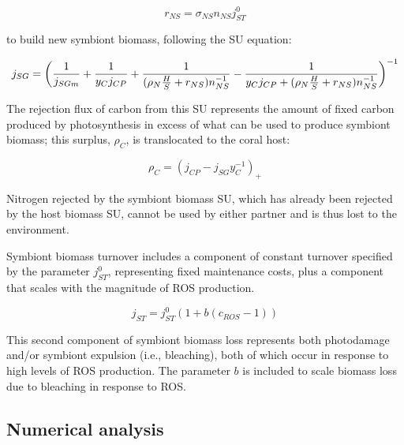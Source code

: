 \documentclass[]{elsarticle} %
\begin{document}
\begin{equation} r_{NS}=\sigma_{NS}n_{NS}j_{ST}^0 \end{equation}

to build new symbiont biomass, following the SU equation:

\begin{equation} j_{SG} = \bigg({1 \over j_{SGm}} + {1 \over y_{C}j_{CP}} + {1 \over {(\rho_N{H \over S} + r_{NS})n_{NS}^{-1}}} - {1 \over {y_{C}j_{CP} + (\rho_N{H \over S} + r_{NS})n_{NS}^{-1}}}\bigg)^{-1} \end{equation}

The rejection flux of carbon from this SU represents the amount of fixed
carbon produced by photosynthesis in excess of what can be used to
produce symbiont biomass; this surplus, \(\rho_C\), is translocated to
the coral host:

\begin{equation} \rho_C = (j_{CP} - j_{SG}y_{C}^{-1})_+ \end{equation}

Nitrogen rejected by the symbiont biomass SU, which has already been
rejected by the host biomass SU, cannot be used by either partner and is
thus lost to the environment.

Symbiont biomass turnover includes a component of constant turnover
specified by the parameter \(j_{ST}^0\), representing fixed maintenance
costs, plus a component that scales with the magnitude of ROS
production.

\begin{equation} j_{ST} = j_{ST}^0(1 + b(c_{ROS}-1)) \end{equation}

This second component of symbiont biomass loss represents both
photodamage and/or symbiont expulsion (i.e., bleaching), both of which
occur in response to high levels of ROS production. The parameter \(b\)
is included to scale biomass loss due to bleaching in response to ROS.

\subsection{Numerical analysis}\label{numerical-analysis}
\end{document}
